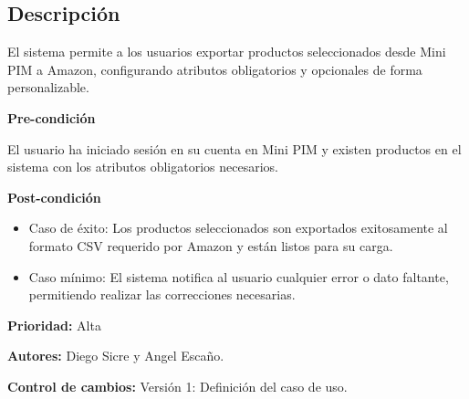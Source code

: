 {}

\subsection*{Descripción}
El sistema permite a los usuarios exportar productos seleccionados desde Mini PIM a Amazon, configurando atributos obligatorios y opcionales de forma personalizable.

\vspace{0.15cm}

\textbf{Pre-condición}\par
El usuario ha iniciado sesión en su cuenta en Mini PIM y existen productos en el sistema con los atributos obligatorios necesarios.

\vspace{0.15cm}

\textbf{Post-condición}
\begin{itemize}
    \item Caso de éxito: Los productos seleccionados son exportados exitosamente al formato CSV requerido por Amazon y están listos para su carga.
    \item Caso mínimo: El sistema notifica al usuario cualquier error o dato faltante, permitiendo realizar las correcciones necesarias.
\end{itemize}

\textbf{Prioridad:}
Alta

\vspace{0.15cm}

\textbf{Autores:}
Diego Sicre y Angel Escaño.

\vspace{0.15cm}

\textbf{Control de cambios: } Versión 1: Definición del caso de uso.

